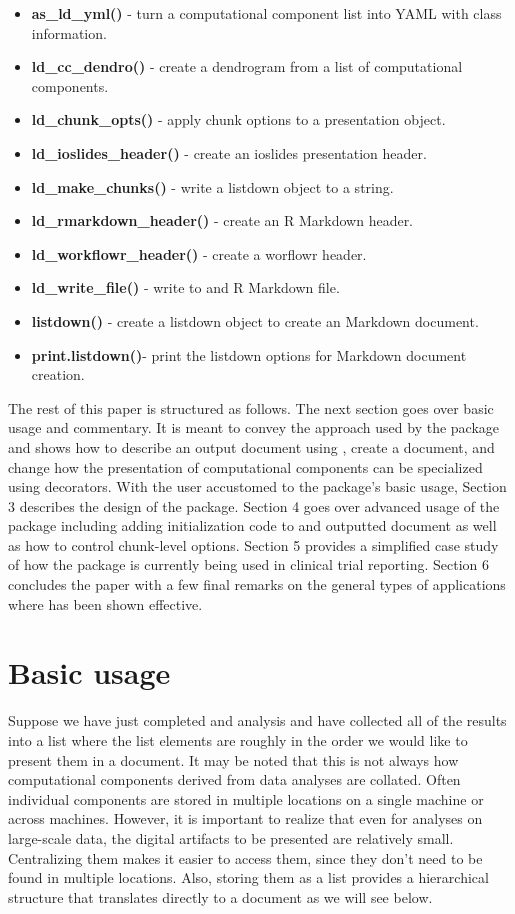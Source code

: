 \documentclass[
]{jss}
\begin{document}
\begin{itemize}
\item{\bf as\_ld\_yml() }{- turn a computational component list into YAML with class information.}
\item{\bf ld\_cc\_dendro() }{- create a dendrogram from a list of computational components.}
\item{\bf ld\_chunk\_opts() }{- apply chunk options to a presentation object.}
\item{\bf ld\_ioslides\_header() }{- create an ioslides presentation header.}
\item{\bf ld\_make\_chunks() }{- write a listdown object to a string.}
\item{\bf ld\_rmarkdown\_header() }{- create an R Markdown header.}
\item{\bf ld\_workflowr\_header() }{- create a worflowr header.}
\item{\bf ld\_write\_file() }{- write to and R Markdown file.}
\item{\bf listdown() }{- create a listdown object to create an  Markdown document.}
\item{\bf print.listdown()}{- print the listdown options for  Markdown document creation.}
\end{itemize}

The rest of this paper is structured as follows. The next section goes
over basic usage and commentary. It is meant to convey the
approach used by the package and shows how to describe an output
document using , create a document, and change how the
presentation of computational components can be specialized using
 decorators. With the user accustomed to the package's
basic usage, Section 3 describes the design of the package. Section 4
goes over advanced usage of the package including adding initialization
code to and outputted document as well as how to control chunk-level
options. Section 5 provides a simplified case study of how the package
is currently being used in clinical trial reporting. Section 6 concludes
the paper with a few final remarks on the general types of applications
where  has been shown effective.

\hypertarget{basic-usage}{%
\section{Basic usage}\label{basic-usage}}

Suppose we have just completed and analysis and have collected all of
the results into a list where the list elements are roughly in the order
we would like to present them in a document. It may be noted that this
is not always how computational components derived from data analyses
are collated. Often individual components are stored in multiple
locations on a single machine or across machines. However, it is
important to realize that even for analyses on large-scale data, the
digital artifacts to be presented are relatively small. Centralizing
them makes it easier to access them, since they don't need to be found
in multiple locations. Also, storing them as a list provides a
hierarchical structure that translates directly to a document as we will
see below.
\end{document}
